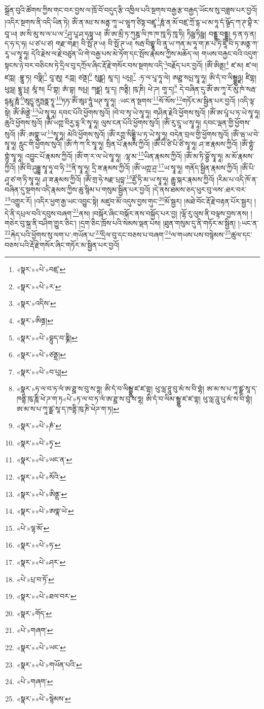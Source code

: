 སྒྲོན་བུའི་ཚོགས་ཀྱིས་གང་བར་བྱས་ལ་ཁྲོ་བོ་བདུད་རྩི་འཁྱིལ་པའི་སྔགས་བརྒྱ་རྩ་བརྒྱད་ཡོངས་སུ་བཟླས་པར་བྱའོ། །འདིར་སྔགས་ནི་འདི་ཡིན་ཏེ། ཨོཾ་ན་མཿ་ས་མནྟ་ཀཱ་ཡ་ཝཱཀ་ཙིཏྟ་བཛྲཱ་\footnote{«སྣར་»«པེ་»བཛྲ་}ཎཱཾ་ན་མོ་བཛྲ་ཀྲོ་དྷ་ཡ་མ་ཧཱ་དཾ་ཥྚྲོད་ཀ་ཊ་བྷཻ་ར་བཱ་ཡ། ཨ་སི་མུ་ས་ལ་པ་ལ་\footnote{«སྣར་»«པེ་»ར་}ཤུ་པཱ་ཤ་ཧསྟཱ་ཡ། ཨོཾ་ཨ་མྲྀ་ཏ་ཀུཎྜ་ལི་ཁ་ཁ་ཁཱ་ཧི་ཁཱ་ཧི། ཏིཥྛ་ཏིཥྛ། བནྡྷ་བནྡྷ། ཧ་ན་ཧ་ན། ད་ཧ་ད་ཧ། པ་ཙ་པ་ཙ། གརྫ་གརྫ། བི་སྥོ་ཊ་ཡ། བི་སྥོ་ཊ་ཡ། སརྦ་བིགྷྣཱ་བི་ནཱ་ཡ་ཀན་མ་ཧཱ་ག་ཎ་པ་ཏི་ཛཱི་བི་ཏ་ཨནྟ་ཀ་རཱ་ཡ་སྭཱ་ཧཱ། དེའི་རྗེས་ལ་རྗེ་བཙུན་ཡི་གེ་བརྒྱ་པས་མེ་ཏོག་དང་སྤོས་རྣམས་ཀྱིས་མཆོད་ལ། གཡས་བརྐྱང་བའི་འདུག་སྟངས་ཉེ་བར་བཅིངས་ཏེ་དྲིལ་བུ་དཀྲོལ་ཞིང་རྡོ་རྗེ་གསོར་བས་སྔགས་འདི་\footnote{«སྣར་»འདིས་}བརྗོད་པར་བྱའོ། །ཨོཾ་ཨིནྡ།\footnote{«སྣར་»ཨིནྜ།} ཛ་མ། ཛ་ལ། ཛཀྑ། :བྷཱུ་ཏ། བཧྣི།\footnote{«སྣར་»«པེ་»བྷུད་བ་ཎྞི།} བཱ་ཨུ། རཀྑ། ཙནྡ།\footnote{«སྣར་»«པེ་»ཙནྡྲ།} སུཛྫ། མཱ་ད། པཔྤ།\footnote{«སྣར་»«པེ་»བ་པུ།} :ཏ་ལ་པཱ་ཏཱ་ལེ། ཨཊྛ་སཔྤ་སྭཱ་ཧཱ། ཨི་དཾ་བ་ལིམྦྷུཉྫ། ཛིགྷ། ཕུལླ། དྷཱུ་པྤ། མཱཾ་ས། པིཾ་གྷ། ཨཾ་བྷ། སཔྤ། ཀཛྫ། སཱ་ད། ཁནྟི། ཁུ་ཎི། ཕེ་ཌ། གཱ་ད།\footnote{«སྣར་»ཏ་ལ་བ་ཏ་ལཾ་ཨ་ཊྛ་ས་བུ་ས་ཧྷ། ཨི་དཾ་བ་ལིམྦྷུ་ཛ་ཛ་གྷ། ཕུ་ལླ་ཊཱུ་བུ་མཾ་ས་བི་གྷཾ། ཨ་མ་ས་པ་ཀཱ་ཛྫ་སཱ་ད་ཁནྷི་ཁུ་ཎཱི་ཕེ་ཌ་ག་ཏ«པེ་»ཏ་ལ་བ་ཏ་ལཾ་ཨ་ཊྛ་ས་བུ་ས་ཧྷ། ཨི་དཾ་བ་ལིམ་མྦྷུ་ཛ་ཛ་གྷ། ཕུ་ལླ་ཌཱུ་པུ་མཾ་ས་བི་གྷཾ། ཨ་མ་ས་པ་ཀཱ་ཛྫ་སཱ་ད་ཁནྷི་ཁུ་ཎི་ཕེཌ་ག་ཏ།} དེ་བཞིན་དུ་ཨོཾ་ཨ་ཀཱ་རོ་མུ་ཁཾ་སརྦ་དྷརྨཱ་ཎཱཾ་\footnote{«སྣར་»«པེ་»ཎཾ་}ཨཱདྱཱ་ནུཏྤནྣ་ཏྭཱ་\footnote{«སྣར་»«པེ་»ཏྭ་}ཏཏ་ཨོཾ་ཨཱཿ་ཧཱུཾ་ཕཊ་སྭཱ་ཧཱ། :ཡང་ན་སྔགས་\footnote{«སྣར་»«པེ་»ཡང་ན་}སོ་སོས་\footnote{«སྣར་»«པེ་»སོའི་}གཏོར་མ་སྦྱིན་པར་བྱའོ། །འདི་ལྟ་སྟེ། ཨོཾ་ཨིནྡྲེ་\footnote{«སྣར་»«པེ་»ཨིནྡྲ་}ཡེ་སྭཱ་ཧཱ། དབང་པོའི་ཕྱོགས་སུའོ། །བེ་བ་སྭ་ཡེ་སྭཱ་ཧཱ། གཤིན་རྗེའི་ཕྱོགས་སུའོ། །ཨོཾ་ཨ་པཱཾ་པ་ཏ་ཡེ་སྭཱ་ཧཱ། ཆུའི་ཕྱོགས་སུའོ། །ཨོཾ་ཡཀྵ་བིརྱ་དྷ་རི་སྭཱ་ཧཱ། ལུས་ངན་པོའི་ཕྱོགས་སུའོ། །ཨོཾ་རུ་དྲཱ་ཡ་སྭཱ་ཧཱ། དབང་ལྡན་གྱི་ཕྱོགས་སུའོ། །ཨོཾ་:ཨགྣཱ་ཡ་\footnote{«སྣར་»«པེ་»ཨགྣ་ཡེ་}སྭཱ་ཧཱ། མེའི་ཕྱོགས་སུའོ། །ཨོཾ་རཀྵ་སིདྡྷི་པ་ཏ་ཡེ་སྭཱ་ཧཱ། བདེན་བྲལ་གྱི་ཕྱོགས་སུའོ། །ཨོཾ་ཝ་ཡ་བེ་སྭཱ་ཧཱ། རླུང་གི་ཕྱོགས་སུའོ། །ཨོཾ་ཀཾ་ཀ་རི་སྭཱ་ཧཱ། སྲིན་པོ་རྣམས་ཀྱིའོ། །ཨོཾ་པི་ཙི་པི་ཙི་སྭཱ་ཧཱ། ཤ་ཟ་རྣམས་ཀྱིའོ། །ཨོཾ་གྷུཾ་གྷུཾ་སྭཱ་ཧཱ། འབྱུང་པོ་རྣམས་ཀྱིའོ། །ཨོཾ་ག་ར་ལ་ཡེ་སྭཱ་ཧཱ། :ལྷ་མ་\footnote{«པེ་»ལྷ་མོ་}ཡིན་རྣམས་ཀྱིའོ། །ཨོཾ་མ་ཏི་བྷྱོ་སྭཱ་ཧཱ། མ་མོ་རྣམས་ཀྱིའོ། །ཨོཾ་བི་ཤུདྡྷ་སྭཱ་ཧཱ་བ་ཧི་\footnote{«སྣར་»«པེ་»ཧ་}ནི་སྭཱ་ཧཱ། དྲི་ཟ་རྣམས་ཀྱིའོ། །ཨོཾ་ཡཀྵ་ཤྲ་\footnote{«སྣར་»«པེ་»ཤར་}ཡ་སྭཱ་ཧཱ། གནོད་སྦྱིན་རྣམས་ཀྱིའོ། །ཨོཾ་པི་ཤཱ་ཙ་ག་ཏི་སྭཱ་ཧཱ། ཤ་ཟ་རྣམས་ཀྱིའོ། །ཨོཾ་གྲ་ཧེ་སརྫ་པྲབྟ་\footnote{«པེ་»པྲ་བ་ཏོ་}ཛྱོ་ཏི་མ་ཡ་སྭཱ་ཧཱ། རྒྱུ་སྐར་རྣམས་ཀྱིའོ། །རིམ་པ་འདི་ཁོ་ན་བཞིན་དུ་སྔགས་འདི་རྣམས་ཀྱིས་ཆུ་སྙིམ་པ་གསུམ་སྦྱིན་པར་བྱའོ། །དེ་ནས་ཐམས་ཅད་ཕུར་བུ་ལས་:ཐར་བར་\footnote{«སྣར་»«པེ་»ཐལ་བར་}འགྱུར་རོ། །འདིར་ཕྱག་རྒྱ་ཡང་འབྱུང་སྟེ། མཛུབ་མོ་འདུས་བྱས་གུང་\footnote{«སྣར་»གོད་}མོ་སྦྱར། །མཐེ་བོང་རྡོ་རྗེ་བརྟན་པོར་སྦྱར། །དེ་ནི་དཔྲལ་བའི་དབུས་བཞག་\footnote{«པེ་»གཞག་}ནས། །བསྐོར་ཞིང་བསྐོར་ནས་བསྐྱོད་པར་བྱ། །ལྷོ་རུ་ལུས་ནི་བལྟས་བྱས་ནས། །གཅེར་བུ་སྐྲ་ནི་བཤིག་གྱུར་ཅིང་། །དྲག་ཅིང་ཁྲོས་པའི་སེམས་ལྡན་པས། །ཐུན་གསུམ་དུ་ནི་གཏོར་མ་སྦྱིན། །:ཡང་ན་\footnote{«སྣར་»«པེ་»ཡང་}རྐེད་པའི་ཕྱོགས་སུ་ལག་པ་:གཡོན་པ་\footnote{«སྣར་»«པེ་»གཡོན་པའི་}དྲིལ་བུ་དང་བཅས་པ་བཞག་\footnote{«པེ་»གཞག་}ལ་གཡས་པས་བསྙེམས་\footnote{«སྣར་»«པེ་»སྙེམས་}ཚུལ་དང་བཅས་པའི་རྡོ་རྗེ་གསོར་ཞིང་གཏོར་མ་སྦྱིན་པར་བྱའོ། 